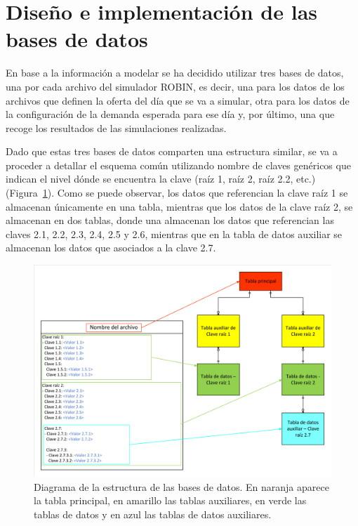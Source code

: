 \section{Diseño e implementación de las bases de datos}
\label{sec:diseñoImplementacionBasesDeDatos}

En base a la información a modelar se ha decidido utilizar tres bases de datos, una por cada archivo del simulador ROBIN, es decir, una para los datos de los archivos que definen la oferta del día que se va a simular, otra para los datos de la configuración de la demanda esperada para ese día y, por último, una que recoge los resultados de las simulaciones realizadas.

Dado que estas tres bases de datos comparten una estructura similar, se va a proceder a detallar el esquema común utilizando nombre de claves genéricos que indican el nivel dónde se encuentra la clave (raíz 1, raíz 2, raíz 2.2, etc.) (Figura~\ref{fig:DiagramaEstructuraBaseDeDatos}). Como se puede observar, los datos que referencian la clave raíz 1 se almacenan únicamente en una tabla, mientras que los datos de la clave raíz 2, se almacenan en dos tablas, donde una almacenan los datos que referencian las claves 2.1, 2.2, 2.3, 2.4, 2.5 y 2.6, mientras que en la tabla de datos auxiliar se almacenan los datos que asociados a la clave 2.7.

\begin{figure}[H]
\centering
\includegraphics[width=1\textwidth]{fig/Diagramas/Estructura bases de datos.pdf}
\caption{Diagrama de la estructura de las bases de datos. En naranja aparece la tabla principal, en amarillo las tablas auxiliares, en verde las tablas de datos y en azul las tablas de datos auxiliares.}
\label{fig:DiagramaEstructuraBaseDeDatos}
\end{figure}

